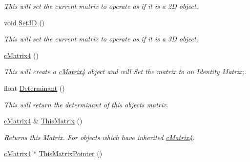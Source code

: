 \begin{DoxyCompactItemize}
\begin{DoxyCompactList}\small\item\em This will set the current matrix to operate as if it is a 2D object. \end{DoxyCompactList}\item 
\hypertarget{classc_matrix4_a746ce09337cbf6a3292cbe15991efd79}{
void \hyperlink{classc_matrix4_a746ce09337cbf6a3292cbe15991efd79}{Set3D} ()}
\label{classc_matrix4_a746ce09337cbf6a3292cbe15991efd79}

\begin{DoxyCompactList}\small\item\em This will set the current matrix to operate as if it is a 3D object. \end{DoxyCompactList}\item 
\hypertarget{classc_matrix4_a51d8e6bf6bbb6b998878fe978c748e14}{
\hyperlink{classc_matrix4_a51d8e6bf6bbb6b998878fe978c748e14}{cMatrix4} ()}
\label{classc_matrix4_a51d8e6bf6bbb6b998878fe978c748e14}

\begin{DoxyCompactList}\small\item\em This will create a \hyperlink{classc_matrix4}{cMatrix4} object and will Set the matrix to an Identity Matrix;. \end{DoxyCompactList}\item 
\hypertarget{classc_matrix4_a39cf7cefa0672684e69eb4af89366270}{
float \hyperlink{classc_matrix4_a39cf7cefa0672684e69eb4af89366270}{Determinant} ()}
\label{classc_matrix4_a39cf7cefa0672684e69eb4af89366270}

\begin{DoxyCompactList}\small\item\em This will return the determinant of this objects matrix. \end{DoxyCompactList}\item 
\hypertarget{classc_matrix4_ac39fd297327a7103ff26e227bec5295e}{
\hyperlink{classc_matrix4}{cMatrix4} \& \hyperlink{classc_matrix4_ac39fd297327a7103ff26e227bec5295e}{ThisMatrix} ()}
\label{classc_matrix4_ac39fd297327a7103ff26e227bec5295e}

\begin{DoxyCompactList}\small\item\em Returns this Matrix. For objects which have inherited \hyperlink{classc_matrix4}{cMatrix4}. \end{DoxyCompactList}\item 
\hypertarget{classc_matrix4_a5b57ac77fee2c235af694060361f84d2}{
\hyperlink{classc_matrix4}{cMatrix4} $\ast$ \hyperlink{classc_matrix4_a5b57ac77fee2c235af694060361f84d2}{ThisMatrixPointer} ()}
\label{classc_matrix4_a5b57ac77fee2c235af694060361f84d2}


\end{DoxyCompactItemize}
